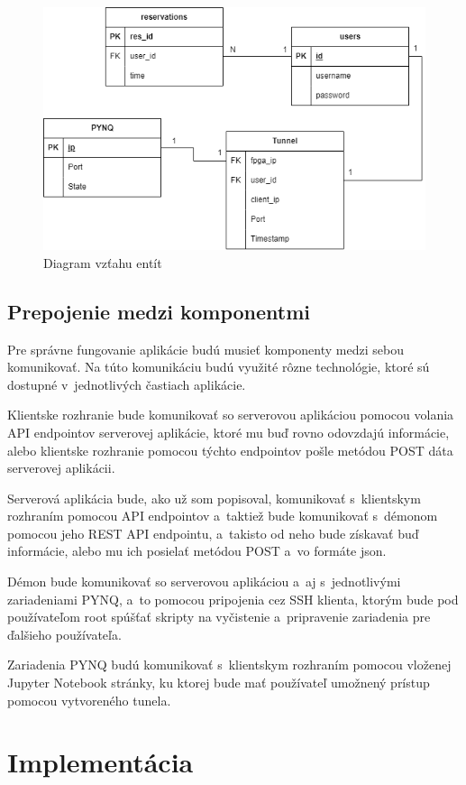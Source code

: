 \begin{figure}[t] \label{ER diagram}
    \centering
    \includegraphics[width=0.8\linewidth]{obrazky-figures/ER.png}
    \caption{Diagram vzťahu entít}
\end{figure}

\section{Prepojenie medzi komponentmi}

Pre správne fungovanie aplikácie budú musieť komponenty medzi sebou komunikovať. Na túto komunikáciu budú využité rôzne technológie, ktoré sú dostupné v~jednotlivých častiach aplikácie.

Klientske rozhranie bude komunikovať so serverovou aplikáciou pomocou volania API endpointov serverovej aplikácie, ktoré mu buď rovno odovzdajú informácie, alebo klientske rozhranie pomocou týchto endpointov pošle metódou POST dáta serverovej aplikácii.

Serverová aplikácia bude, ako už som popisoval, komunikovať s~klientskym rozhraním pomocou API endpointov a~taktiež bude komunikovať s~démonom pomocou jeho REST API endpointu, a~takisto od neho bude získavať buď informácie, alebo mu ich posielať metódou POST a~vo formáte json.

Démon bude komunikovať so serverovou aplikáciou a~aj s~jednotlivými zariadeniami PYNQ, a~to pomocou pripojenia cez SSH klienta, ktorým bude pod používateľom root spúšťať skripty na vyčistenie a~pripravenie zariadenia pre ďalšieho používateľa.

Zariadenia PYNQ budú komunikovať s~klientskym rozhraním pomocou vloženej Jupyter Notebook stránky, ku ktorej bude mať používateľ umožnený prístup pomocou vytvoreného tunela.


\chapter{Implementácia} 
\label{Implementacia}

